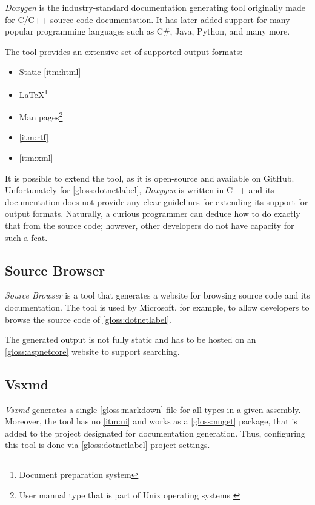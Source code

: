 \textit{Doxygen} is the industry-standard documentation generating tool originally made for C/C++ source code documentation. It has later added support for many popular programming languages such as C\#, Java, Python, and many more.

The tool provides an extensive set of supported output formats:
\begin{itemize}
    \item Static \ref{itm:html}
    \item \LaTeX\footnote{Document preparation system}
    \item Man pages\footnote{User manual type that is part of Unix operating systems \cite{credocs_limited_latex_2022}}
    \item \ref{itm:rtf}
    \item \ref{itm:xml}
\end{itemize}

It is possible to extend the tool, as it is open-source and available on GitHub. Unfortunately for \ref{gloss:dotnetlabel}, \textit{Doxygen} is written in C++ and its documentation does not provide any clear guidelines for extending its support for output formats. Naturally, a curious programmer can deduce how to do exactly that from the source code; however, other developers do not have capacity for such a feat.

\subsection{Source Browser}

\textit{Source Browser} is a tool that generates a website for browsing source code and its documentation. The tool is used by Microsoft, for example, to allow developers to browse the source code of \ref{gloss:dotnetlabel}.

The generated output is not fully static and has to be hosted on an \ref{gloss:aspnetcore} website to support searching.

\subsection{Vsxmd} \label{ssec:vsxmd}

\textit{Vsxmd} generates a single \ref{gloss:markdown} file for all types in a given assembly. Moreover, the tool has no \ref{itm:ui} and works as a \ref{gloss:nuget} package, that is added to the project designated for documentation generation. Thus, configuring this tool is done via \ref{gloss:dotnetlabel} project settings.

